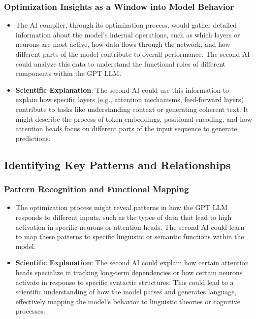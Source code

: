 \documentclass{article}
\begin{document}
\subsubsection{Optimization Insights as a Window into Model Behavior}
\begin{itemize}
    \item The AI compiler, through its optimization process, would gather detailed information about the model’s internal operations, such as which layers or neurons are most active, how data flows through the network, and how different parts of the model contribute to overall performance. The second AI could analyze this data to understand the functional roles of different components within the GPT LLM.
    \item \textbf{Scientific Explanation}: The second AI could use this information to explain how specific layers (e.g., attention mechanisms, feed-forward layers) contribute to tasks like understanding context or generating coherent text. It might describe the process of token embeddings, positional encoding, and how attention heads focus on different parts of the input sequence to generate predictions.
\end{itemize}

\subsection{Identifying Key Patterns and Relationships}
\subsubsection{Pattern Recognition and Functional Mapping}
\begin{itemize}
    \item The optimization process might reveal patterns in how the GPT LLM responds to different inputs, such as the types of data that lead to high activation in specific neurons or attention heads. The second AI could learn to map these patterns to specific linguistic or semantic functions within the model.
    \item \textbf{Scientific Explanation}: The second AI could explain how certain attention heads specialize in tracking long-term dependencies or how certain neurons activate in response to specific syntactic structures. This could lead to a scientific understanding of how the model parses and generates language, effectively mapping the model’s behavior to linguistic theories or cognitive processes.
\end{itemize}
\end{document}
